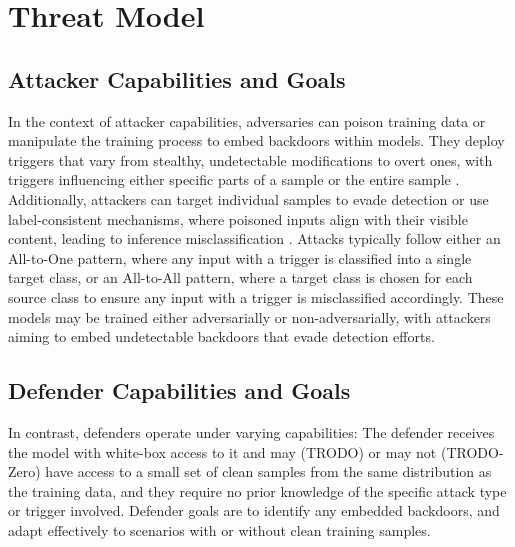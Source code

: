 \section{Threat Model}
\label{threat}

\subsection{Attacker Capabilities and Goals}
In the context of attacker capabilities, adversaries can poison training data \cite{badnets, blended} or manipulate the training process \cite{wanet, inputaware} to embed backdoors within models. They deploy triggers that vary from stealthy, undetectable modifications to overt ones, with triggers influencing either specific parts of a sample \cite{badnets, inputaware} or the entire sample \cite{sig, bpp}. Additionally, attackers can target individual samples \cite{ssba} to evade detection or use label-consistent mechanisms, where poisoned inputs align with their visible content, leading to inference misclassification \cite{turner2019label, sig}. Attacks typically follow either an All-to-One pattern, where any input with a trigger is classified into a single target class, or an All-to-All pattern, where a target class is chosen for each source class to ensure any input with a trigger is misclassified accordingly. These models may be trained either adversarially or non-adversarially, with attackers aiming to embed undetectable backdoors that evade detection efforts. 

\subsection{Defender Capabilities and Goals}
In contrast, defenders operate under varying capabilities: The defender receives the model with white-box access to it and may (TRODO) or may not (TRODO-Zero) have access to a small set of clean samples from the same distribution as the training data, and they require no prior knowledge of the specific attack type or trigger involved. Defender goals are to identify any embedded backdoors, and adapt effectively to scenarios with or without clean training samples.
